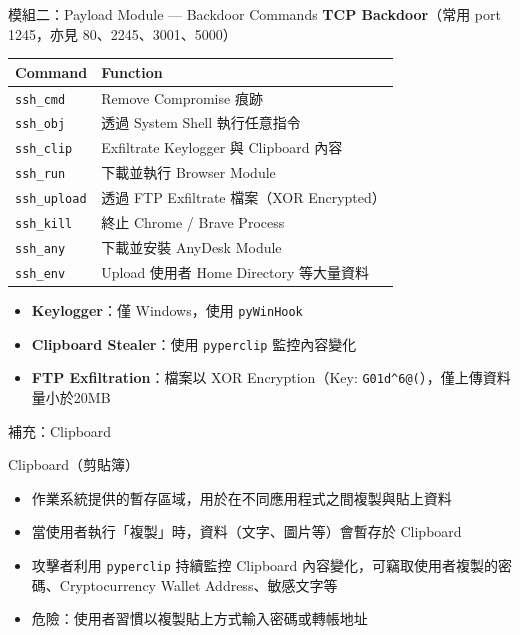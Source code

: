 \documentclass{beamer}
\begin{document}
\begin{frame}{模組二：Payload Module — Backdoor Commands}
  \textbf{TCP Backdoor}（常用 port 1245，亦見 80、2245、3001、5000）

  \vspace{0.2cm}
  \begin{small}
  \begin{tabular}{ll}
    \toprule
    \textbf{Command} & \textbf{Function} \\
    \midrule
    \texttt{ssh\_cmd} & Remove Compromise 痕跡 \\
    \texttt{ssh\_obj} & 透過 System Shell 執行任意指令 \\
    \texttt{ssh\_clip} & Exfiltrate Keylogger 與 Clipboard 內容 \\
    \texttt{ssh\_run} & 下載並執行 Browser Module \\
    \texttt{ssh\_upload} & 透過 FTP Exfiltrate 檔案（XOR Encrypted） \\
    \texttt{ssh\_kill} & 終止 Chrome / Brave Process \\
    \texttt{ssh\_any} & 下載並安裝 AnyDesk Module \\
    \texttt{ssh\_env} & Upload 使用者 Home Directory 等大量資料 \\
    \bottomrule
  \end{tabular}
  \end{small}

  \vspace{0.3cm}
  \begin{itemize}
    \item \textbf{Keylogger}：僅 Windows，使用 \texttt{pyWinHook}
    \item \textbf{Clipboard Stealer}：使用 \texttt{pyperclip} 監控內容變化
    \item \textbf{FTP Exfiltration}：檔案以 XOR Encryption（Key: \texttt{G01d\^{}6@(}），僅上傳資料量小於20MB
  \end{itemize}
\end{frame}

\begin{frame}{補充：Clipboard}
  \begin{block}{Clipboard（剪貼簿）}
    \begin{itemize}
      \item 作業系統提供的暫存區域，用於在不同應用程式之間複製與貼上資料
      \item 當使用者執行「複製」時，資料（文字、圖片等）會暫存於 Clipboard
      \item 攻擊者利用 \texttt{pyperclip} 持續監控 Clipboard 內容變化，可竊取使用者複製的密碼、Cryptocurrency Wallet Address、敏感文字等
      \item 危險：使用者習慣以複製貼上方式輸入密碼或轉帳地址
    \end{itemize}
  \end{block}

\end{frame}
\end{document}
